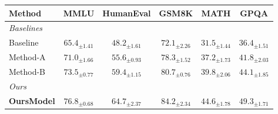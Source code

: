 \documentclass{article}
\begin{document}
\centering

\begin{tabular}{lccccc}
\toprule
\textbf{Method} & \textbf{MMLU} & \textbf{HumanEval} & \textbf{GSM8K} & \textbf{MATH} & \textbf{GPQA} \\
\midrule
    \multicolumn{6}{l}{\textit{Baselines}} \\
    Baseline & $65.4_{\pm 1.41}$ & $48.2_{\pm 1.61}$ & $72.1_{\pm 2.26}$ & $31.5_{\pm 1.44}$ & $36.4_{\pm 1.51}$ \\
    Method-A & $71.0_{\pm 1.66}$ & $55.6_{\pm 0.93}$ & $78.3_{\pm 1.52}$ & $37.2_{\pm 1.73}$ & $41.8_{\pm 2.03}$ \\
    Method-B & $73.5_{\pm 0.77}$ & $59.4_{\pm 1.15}$ & $80.7_{\pm 0.76}$ & $39.8_{\pm 2.06}$ & $44.1_{\pm 1.85}$ \\
    \midrule
    \multicolumn{6}{l}{\textit{Ours}} \\
    \textbf{OursModel} & $\mathbf{76.8}_{\pm 0.68}$ & $\mathbf{64.7}_{\pm 2.37}$ & $\mathbf{84.2}_{\pm 2.34}$ & $\mathbf{44.6}_{\pm 1.78}$ & $\mathbf{49.3}_{\pm 1.71}$ \\
\bottomrule
\end{tabular}
\end{document}
